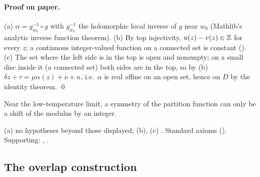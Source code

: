 \paragraph{Proof on paper.}  (a) $\alpha=g_{w_0}^{-1}\circ g$ with $g_{w_0}^{-1}$ the holomorphic local inverse of $g$ near $w_0$
(Mathlib's analytic inverse function theorem).  (b) By top injectivity, $u(z)-v(z)\in{\mathbb{Z}}$ for every $z$; a continuous integer-valued
function on a connected set is constant ().  (c) The set where the left side is in the top is
open and nonempty; on a small disc inside it (a connected set) both sides are in the top, so by (b) $\delta z+\tau=\mu\alpha(z)+\nu+n$, i.e.\ $\alpha$ is real affine on an open set,
hence on $D$ by the identity theorem. \qed
\begin{physics}Near the low-temperature limit, a symmetry of the partition function can only be a shift of the modulus by an
integer.\end{physics}
\begin{status}(a) no hypotheses beyond those displayed; (b), (c) .  Standard axioms
().  Supporting: , .\end{status}

\subsection{The overlap construction}

